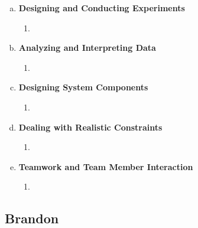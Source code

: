 \documentclass[11pt]{article}   %
\begin{document}
\begin{enumerate} [a)]
\item  {\bf Designing and Conducting Experiments}
\begin{enumerate} [$\cdot$]
\item 
\end{enumerate}
\item  {\bf Analyzing and Interpreting Data}
\begin{enumerate} [$\cdot$]
\item 
\end{enumerate}
\item {\bf Designing System Components}
\begin{enumerate} [$\cdot$]
\item 
\end{enumerate}
\item {\bf Dealing with Realistic Constraints}
\begin{enumerate} [$\cdot$]
\item 
\end{enumerate}
\item  {\bf Teamwork and Team Member Interaction}
\begin{enumerate} [$\cdot$]
\item 
\end{enumerate}
\end{enumerate}

\subsection*{Brandon}
\end{document}
